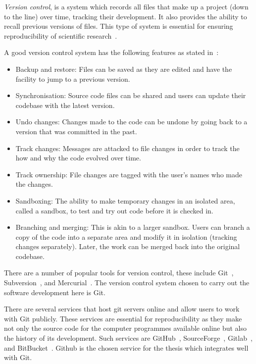 \textit{Version control}, is a system which records all files that make up a
project (down to the line) over time, tracking their development. It also
provides the ability to recall previous versions of files. This type of system
is essential for ensuring reproducibility of scientific research~\cite{Sandve2013,
Wilson2014}.

A good version control system has the following features as stated in~\cite{Ruparelia2010}:

\begin{itemize}
    \item Backup and restore: Files can be saved as they are edited and have the facility to
    jump to a previous version.
    \item Synchronisation: Source code files can be shared and users can update their
    codebase with the latest version.
    \item Undo changes: Changes made to the code can be undone by going back
    to a version that was committed in the past.
    \item Track changes: Messages are attacked to file changes in order to track the
    how and why the code evolved over time.
    \item Track ownership: File changes are tagged with the user's names who made
    the changes.
    \item Sandboxing: The ability to make temporary changes in an isolated area,
    called a sandbox, to test and try out code before it is checked in.
    \item Branching and merging: This is akin to a larger sandbox. Users can
    branch a copy of the code into a separate area and modify it in
    isolation (tracking changes separately). Later, the work can be merged back
    into the original codebase.
\end{itemize}

There are a number of popular tools for version control, these include Git~\cite{git},
Subversion~\cite{subversion}, and Mercurial~\cite{mercurial}. The version
control system chosen to carry out the software development here is Git.

There are several services that host git servers online and allow users to work
with Git publicly. These services are essential for reproducibility as they make
not only the source code for the computer programmes available online but also
the history of its development. Such services are GitHub~\cite{github},
SourceForge~\cite{sourceforge}, Gitlab~\cite{gitlab}, and BitBucket~\cite{bitbucket}.
Github is the chosen service for the thesis which integrates well with Git.

